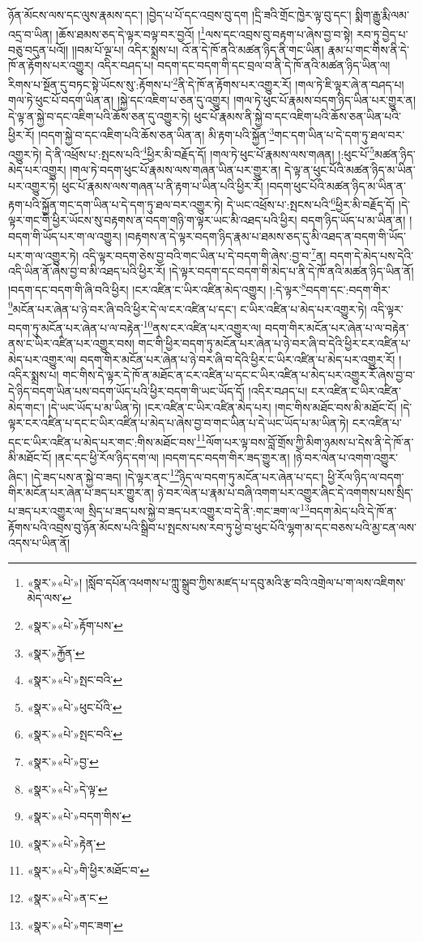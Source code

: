 ཉོན་མོངས་ལས་དང་ལུས་རྣམས་དང་། །བྱེད་པ་པོ་དང་འབྲས་བུ་དག །དྲི་ཟའི་གྲོང་ཁྱེར་ལྟ་བུ་དང་། སྨིག་རྒྱུ་རྨི་ལམ་འདྲ་བ་ཡིན། །ཆོས་ཐམས་ཅད་དེ་ལྟར་བལྟ་བར་བྱའོ། །\footnote{«སྣར་»«པེ་»། །སློབ་དཔོན་འཕགས་པ་ཀླུ་སྒྲུབ་ཀྱིས་མཛད་པ་དབུ་མའི་རྩ་བའི་འགྲེལ་པ་ག་ལས་འཇིགས་མེད་ལས་}ལས་དང་འབྲས་བུ་བརྟག་པ་ཞེས་བྱ་བ་སྟེ། རབ་ཏུ་བྱེད་པ་བཅུ་བདུན་པའོ།། །།བམ་པོ་ལྔ་པ། འདིར་སྨྲས་པ། འོ་ན་དེ་ཁོ་ནའི་མཚན་ཉིད་ནི་གང་ཡིན། རྣམ་པ་གང་གིས་ནི་དེ་ཁོ་ན་རྟོགས་པར་འགྱུར། འདིར་བཤད་པ། བདག་དང་བདག་གི་དང་བྲལ་བ་ནི་དེ་ཁོ་ནའི་མཚན་ཉིད་ཡིན་ལ། རིགས་པ་སྔོན་དུ་བཏང་སྟེ་ཡོངས་སུ་:རྟོགས་པ་\footnote{«སྣར་»«པེ་»རྟོག་པས་}ནི་དེ་ཁོ་ན་རྟོགས་པར་འགྱུར་རོ། །གལ་ཏེ་ཇི་ལྟར་ཞེ་ན་བཤད་པ། གལ་ཏེ་ཕུང་པོ་བདག་ཡིན་ན། །སྐྱེ་དང་འཇིག་པ་ཅན་དུ་འགྱུར། །གལ་ཏེ་ཕུང་པོ་རྣམས་བདག་ཉིད་ཡིན་པར་གྱུར་ན། དེ་ལྟ་ན་སྐྱེ་བ་དང་འཇིག་པའི་ཆོས་ཅན་དུ་འགྱུར་ཏེ། ཕུང་པོ་རྣམས་ནི་སྐྱེ་བ་དང་འཇིག་པའི་ཆོས་ཅན་ཡིན་པའི་ཕྱིར་རོ། །བདག་སྐྱེ་བ་དང་འཇིག་པའི་ཆོས་ཅན་ཡིན་ན། མི་རྟག་པའི་སྐྱོན་\footnote{«སྣར་»རྐྱོན་}གང་དག་ཡིན་པ་དེ་དག་ཏུ་ཐལ་བར་འགྱུར་ཏེ། དེ་ནི་འཕྲོས་པ་:སྤངས་པའི་\footnote{«སྣར་»«པེ་»སྤང་བའི་}ཕྱིར་མི་བརྗོད་དོ། །གལ་ཏེ་ཕུང་པོ་རྣམས་ལས་གཞན། །:ཕུང་པོ་\footnote{«སྣར་»«པེ་»ཕུང་པོའི་}མཚན་ཉིད་མེད་པར་འགྱུར། །གལ་ཏེ་བདག་ཕུང་པོ་རྣམས་ལས་གཞན་ཡིན་པར་གྱུར་ན། དེ་ལྟ་ན་ཕུང་པོའི་མཚན་ཉིད་མ་ཡིན་པར་འགྱུར་ཏེ། ཕུང་པོ་རྣམས་ལས་གཞན་པ་ནི་རྟག་པ་ཡིན་པའི་ཕྱིར་རོ། །བདག་ཕུང་པོའི་མཚན་ཉིད་མ་ཡིན་ན་རྟག་པའི་སྐྱོན་གང་དག་ཡིན་པ་དེ་དག་ཏུ་ཐལ་བར་འགྱུར་ཏེ། དེ་ཡང་འཕྲོས་པ་:སྤངས་པའི་\footnote{«སྣར་»«པེ་»སྤང་བའི་}ཕྱིར་མི་བརྗོད་དོ། །དེ་ལྟར་གང་གི་ཕྱིར་ཡོངས་སུ་བརྟགས་ན་བདག་གཉི་ག་ལྟར་ཡང་མི་འཐད་པའི་ཕྱིར། བདག་ཉིད་ཡོད་པ་མ་ཡིན་ན། །བདག་གི་ཡོད་པར་ག་ལ་འགྱུར། །བརྟགས་ན་དེ་ལྟར་བདག་ཉིད་རྣམ་པ་ཐམས་ཅད་དུ་མི་འཐད་ན་བདག་གི་ཡོད་པར་ག་ལ་འགྱུར་ཏེ། འདི་ལྟར་བདག་ཅེས་བྱ་བའི་གང་ཡིན་པ་དེ་བདག་གི་ཞེས་:བྱ་བ་\footnote{«སྣར་»«པེ་»བྱ་}ན། བདག་དེ་མེད་པས་དེའི་འདི་ཡིན་ནོ་ཞེས་བྱ་བ་མི་འཐད་པའི་ཕྱིར་རོ། །དེ་ལྟར་བདག་དང་བདག་གི་མེད་པ་ནི་དེ་ཁོ་ནའི་མཚན་ཉིད་ཡིན་ནོ། །བདག་དང་བདག་གི་ཞི་བའི་ཕྱིར། །ངར་འཛིན་ང་ཡིར་འཛིན་མེད་འགྱུར། །:དེ་ལྟར་\footnote{«སྣར་»«པེ་»དེ་ལྟ་}བདག་དང་:བདག་གིར་\footnote{«སྣར་»«པེ་»བདག་གིས་}མངོན་པར་ཞེན་པ་ཉེ་བར་ཞི་བའི་ཕྱིར་དེ་ལ་ངར་འཛིན་པ་དང་། ང་ཡིར་འཛིན་པ་མེད་པར་འགྱུར་ཏེ། འདི་ལྟར་བདག་ཏུ་མངོན་པར་ཞེན་པ་ལ་བརྟེན་\footnote{«སྣར་»«པེ་»རྟེན་}ནས་ངར་འཛིན་པར་འགྱུར་ལ། བདག་གིར་མངོན་པར་ཞེན་པ་ལ་བརྟེན་ནས་ང་ཡིར་འཛིན་པར་འགྱུར་བས། གང་གི་ཕྱིར་བདག་ཏུ་མངོན་པར་ཞེན་པ་ཉེ་བར་ཞི་བ་དེའི་ཕྱིར་ངར་འཛིན་པ་མེད་པར་འགྱུར་ལ། བདག་གིར་མངོན་པར་ཞེན་པ་ཉེ་བར་ཞི་བ་དེའི་ཕྱིར་ང་ཡིར་འཛིན་པ་མེད་པར་འགྱུར་རོ། །འདིར་སྨྲས་པ། གང་གིས་དེ་ལྟར་དེ་ཁོ་ན་མཐོང་ན་ངར་འཛིན་པ་དང་ང་ཡིར་འཛིན་པ་མེད་པར་འགྱུར་རོ་ཞེས་བྱ་བ་དེ་ཉིད་བདག་ཡིན་པས་བདག་ཡོད་པའི་ཕྱིར་བདག་གི་ཡང་ཡོད་དོ། །འདིར་བཤད་པ། ངར་འཛིན་ང་ཡིར་འཛིན་མེད་གང་། །དེ་ཡང་ཡོད་པ་མ་ཡིན་ཏེ། །ངར་འཛིན་ང་ཡིར་འཛིན་མེད་པར། །གང་གིས་མཐོང་བས་མི་མཐོང་ངོ། །དེ་ལྟར་ངར་འཛིན་པ་དང་ང་ཡིར་འཛིན་པ་མེད་པ་ཞེས་བྱ་བ་གང་ཡིན་པ་དེ་ཡང་ཡོད་པ་མ་ཡིན་ཏེ། ངར་འཛིན་པ་དང་ང་ཡིར་འཛིན་པ་མེད་པར་གང་:གིས་མཐོང་བས་\footnote{«སྣར་»«པེ་»གི་ཕྱིར་མཐོང་བ་}ལོག་པར་ལྟ་བས་བློ་གྲོས་ཀྱི་མིག་ཉམས་པ་དེས་ནི་དེ་ཁོ་ན་མི་མཐོང་ངོ། །ནང་དང་ཕྱི་རོལ་ཉིད་དག་ལ། །བདག་དང་བདག་གིར་ཟད་གྱུར་ན། །ཉེ་བར་ལེན་པ་འགག་འགྱུར་ཞིང་། །དེ་ཟད་པས་ན་སྐྱེ་བ་ཟད། །དེ་ལྟར་ནང་\footnote{«སྣར་»«པེ་»ན་ང་}ཉིད་ལ་བདག་ཏུ་མངོན་པར་ཞེན་པ་དང་། ཕྱི་རོལ་ཉིད་ལ་བདག་གིར་མངོན་པར་ཞེན་པ་ཟད་པར་གྱུར་ན། ཉེ་བར་ལེན་པ་རྣམ་པ་བཞི་འགག་པར་འགྱུར་ཞིང་དེ་འགགས་པས་སྲིད་པ་ཟད་པར་འགྱུར་ལ། སྲིད་པ་ཟད་པས་སྐྱེ་བ་ཟད་པར་འགྱུར་བ་དེ་ནི་:གང་ཟག་ལ་\footnote{«སྣར་»«པེ་»གང་ཟག་}བདག་མེད་པའི་དེ་ཁོ་ན་རྟོགས་པའི་འབྲས་བུ་ཉོན་མོངས་པའི་སྒྲིབ་པ་སྤངས་པས་རབ་ཏུ་ཕྱེ་བ་ཕུང་པོའི་ལྷག་མ་དང་བཅས་པའི་མྱ་ངན་ལས་འདས་པ་ཡིན་ནོ། 